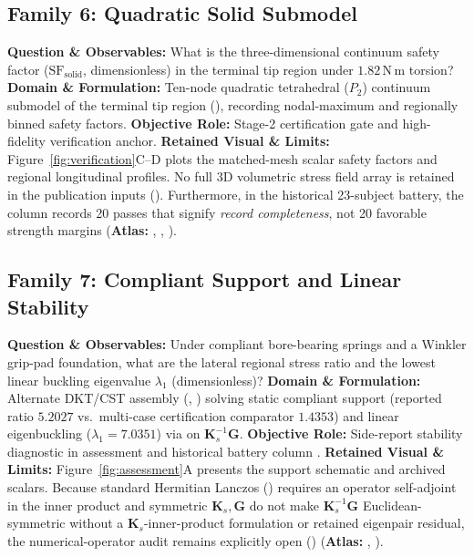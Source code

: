 \subsection{Family 6: Quadratic Solid Submodel}
\label{subsec:family-solid}
\textbf{Question \& Observables:} What is the three-dimensional continuum safety factor ($\mathrm{SF}_{\mathrm{solid}}$, dimensionless) in the terminal tip region under $1.82\,\mathrm{N\,m}$ torsion?
\textbf{Domain \& Formulation:} Ten-node quadratic tetrahedral ($P_2$) continuum submodel of the terminal tip region (), recording nodal-maximum and regionally binned safety factors.
\textbf{Objective Role:} Stage-2 certification gate and high-fidelity verification anchor.
\textbf{Retained Visual \& Limits:} Figure~\ref{fig:verification}C--D plots the matched-mesh scalar safety factors and regional longitudinal profiles. No full 3D volumetric stress field array is retained in the publication inputs (). Furthermore, in the historical 23-subject battery, the  column records 20 passes that signify \emph{record completeness}, not 20 favorable strength margins (\textbf{Atlas:} , , ).

\subsection{Family 7: Compliant Support and Linear Stability}
\label{subsec:family-support}
\textbf{Question \& Observables:} Under compliant bore-bearing springs and a Winkler grip-pad foundation, what are the lateral regional stress ratio and the lowest linear buckling eigenvalue $\lambda_1$ (dimensionless)?
\textbf{Domain \& Formulation:} Alternate DKT/CST assembly (, ) solving static compliant support (reported ratio $5.2027$ vs.\ multi-case certification comparator $1.4353$) and linear eigenbuckling ($\lambda_1 = 7.0351$) via  on $\mathbf{K}_s^{-1}\mathbf{G}$.
\textbf{Objective Role:} Side-report stability diagnostic in assessment and historical battery column .
\textbf{Retained Visual \& Limits:} Figure~\ref{fig:assessment}A presents the support schematic and archived scalars. Because standard Hermitian Lanczos () requires an operator self-adjoint in the inner product and symmetric $\mathbf{K}_s, \mathbf{G}$ do not make $\mathbf{K}_s^{-1}\mathbf{G}$ Euclidean-symmetric without a $\mathbf{K}_s$-inner-product formulation or retained eigenpair residual, the numerical-operator audit remains explicitly open () (\textbf{Atlas:} , ).

